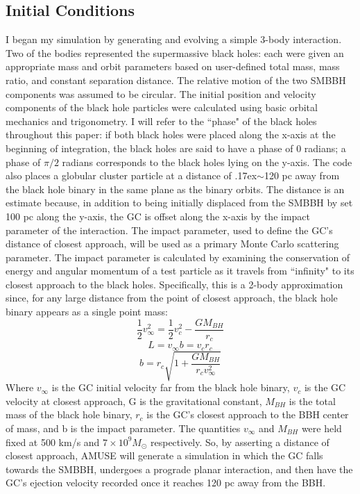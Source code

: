 \documentclass{aastex62}
\begin{document}
\subsection{Initial Conditions}
I began my simulation by generating and evolving a simple 3-body interaction. Two of the bodies represented the supermassive black holes: each were given an appropriate mass and orbit parameters based on user-defined total mass, mass ratio, and constant separation distance. The relative motion of the two SMBBH components was assumed to be circular. The initial position and velocity components of the black hole particles were calculated using basic orbital mechanics and trigonometry. I will refer to the ``phase" of the black holes throughout this paper: if both black holes were placed along the x-axis at the beginning of integration, the black holes are said to have a phase of 0 radians; a phase of $\pi/2$ radians corresponds to the black holes lying on the y-axis. The code also places a globular cluster particle at a distance of {\raise.17ex\hbox{$\scriptstyle\mathtt{\sim}$}}120 pc away from the black hole binary in the same plane as the binary orbits. The distance is an estimate because, in addition to being initially displaced from the SMBBH by set 100 pc along the y-axis, the GC is offset along the x-axis by the impact parameter of the interaction. The impact parameter, used to define the GC's distance of closest approach, will be used as a primary Monte Carlo scattering parameter. The impact parameter is calculated by examining the conservation of energy and angular momentum of a test particle as it travels from ``infinity" to its closest approach to the black holes. Specifically, this is a 2-body approximation since, for any large distance from the point of closest approach, the black hole binary appears as a single point mass:
\begin{equation}
\frac{1}{2}v_{\infty}^2 = \frac{1}{2}v_{c}^2 - \frac{GM_{BH}}{r_{c}}
\end{equation}
\begin{equation}
L = v_{\infty}b = v_{c}r_{c}
\end{equation}
\begin{equation}
b = r_{c}\sqrt{1+\frac{GM_{BH}}{r_{c}v_{\infty}^2}}
\end{equation}
Where $v_{\infty}$ is the GC initial velocity far from the black hole binary, $v_{c}$ is the GC velocity at closest approach, G is the gravitational constant, $M_{BH}$ is the total mass of the black hole binary, $r_{c}$ is the GC's closest approach to the BBH center of mass, and b is the impact parameter.  The quantities $v_{\infty}$ and $M_{BH}$ were held fixed at 500 km/s and $7 \times 10^9 M_{\odot}$ respectively. So, by asserting a distance of closest approach, AMUSE will generate a simulation in which the GC falls towards the SMBBH, undergoes a prograde planar interaction, and then have the GC's ejection velocity recorded once it reaches 120 pc away from the BBH. 
\end{document}
